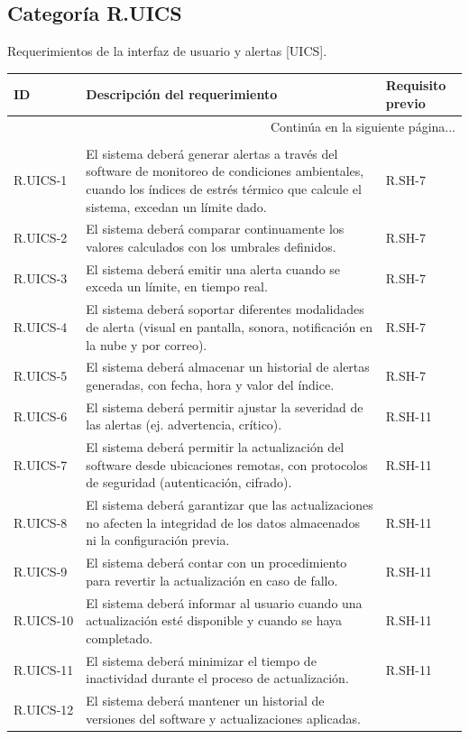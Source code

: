 \documentclass{article}%
\begin{document}
\subsection{Categoría R.UICS}%
\label{subsec:CategoraR.UICS}%
Requerimientos de la interfaz de usuario y alertas [UICS].\newline%
\newline%
%
\begin{longtable}{|p{2cm}|p{9cm}|p{2.5cm}|}%
\hline%
ID&Descripción del requerimiento&Requisito previo\\%
\hline%
\endhead%
\hline%
\multicolumn{3}{|r|}{Continúa en la siguiente página...}\\%
\hline%
\endfoot%
\hline%
\multicolumn{3}{|r|}{Fin de la tabla}\\%
\hline%
\endlastfoot%
R.UICS{-}1& El sistema deberá generar alertas a través del software de monitoreo de condiciones ambientales, cuando los índices de estrés térmico que calcule el sistema, excedan un límite dado.&R.SH{-}7\\%
\hline%
R.UICS{-}2& El sistema deberá comparar continuamente los valores calculados con los umbrales definidos.&R.SH{-}7\\%
\hline%
R.UICS{-}3& El sistema deberá emitir una alerta cuando se exceda un límite, en tiempo real.&R.SH{-}7\\%
\hline%
R.UICS{-}4& El sistema deberá soportar diferentes modalidades de alerta (visual en pantalla, sonora, notificación en la nube y por correo).&R.SH{-}7\\%
\hline%
R.UICS{-}5& El sistema deberá almacenar un historial de alertas generadas, con fecha, hora y valor del índice.&R.SH{-}7\\%
\hline%
R.UICS{-}6& El sistema deberá permitir ajustar la severidad de las alertas (ej. advertencia, crítico).&R.SH{-}11\\%
\hline%
R.UICS{-}7& El sistema deberá permitir la actualización del software desde ubicaciones remotas, con protocolos de seguridad (autenticación, cifrado).&R.SH{-}11\\%
\hline%
R.UICS{-}8& El sistema deberá garantizar que las actualizaciones no afecten la integridad de los datos almacenados ni la configuración previa.&R.SH{-}11\\%
\hline%
R.UICS{-}9& El sistema deberá contar con un procedimiento para revertir la actualización en caso de fallo.&R.SH{-}11\\%
\hline%
R.UICS{-}10& El sistema deberá informar al usuario cuando una actualización esté disponible y cuando se haya completado.&R.SH{-}11\\%
\hline%
R.UICS{-}11& El sistema deberá minimizar el tiempo de inactividad durante el proceso de actualización.&R.SH{-}11\\%
\hline%
R.UICS{-}12& El sistema deberá mantener un historial de versiones del software y actualizaciones aplicadas.&\\%
\hline%
\end{longtable}
\end{document}
